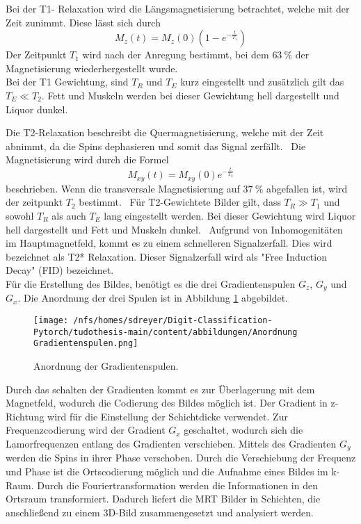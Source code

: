 Bei der T1- Relaxation wird die Längsmagnetisierung betrachtet, welche mit der Zeit zunimmt.
Diese lässt sich durch 
\begin{equation}
    M_z(t) = M_z(0) (1 - e^{-\frac{t}{T_1}})
\end{equation}
Der Zeitpunkt $T_1$ wird nach der Anregung bestimmt, bei dem $\qty{63}{\%}$ der Magnetisierung wiederhergestellt wurde.~\cite{Pollmann}\\
Bei der T1 Gewichtung, sind $T_R$ und $T_E$ kurz eingestellt und zusätzlich gilt das $T_E \ll T_2$.
Fett und Muskeln werden bei dieser Gewichtung hell dargestellt und Liquor dunkel.~\cite{Schlegel}

Die T2-Relaxation beschreibt die Quermagnetisierung, welche mit der Zeit abnimmt, da die Spins dephasieren und somit das Signal zerfällt.~\cite{Dössel}
Die Magnetisierung wird durch die Formel
\begin{equation}
    M_{xy}(t) = M_{xy}(0) e^{-\frac{t}{T_2}} 
\end{equation}
beschrieben.
Wenn die transversale Magnetisierung auf $\qty{37}{\%}$ abgefallen ist, wird der zeitpunkt $T_2$ bestimmt.~\cite{Pollmann}
Für T2-Gewichtete Bilder gilt, dass $T_R \gg T_1$ und sowohl $T_R$ als auch $T_E$  lang eingestellt werden. 
Bei dieser Gewichtung wird Liquor hell dargestellt und Fett und Muskeln dunkel.~\cite{Schlegel} 
Aufgrund von Inhomogenitäten im Hauptmagnetfeld, kommt es zu einem schnelleren Signalzerfall. Dies wird bezeichnet als T2* Relaxation.
Dieser Signalzerfall wird als "Free Induction Decay" (FID) bezeichnet.~\cite{Dössel}\\


Für die Erstellung des Bildes, benötigt es die drei Gradientenspulen $G_z$, $G_y$ und $G_x$. Die Anordnung der drei Spulen 
ist in Abbildung \ref{fig:an Grad} abgebildet.
\begin{figure}[htbp]
  \centering
  \texttt{[image: /nfs/homes/sdreyer/Digit-Classification-Pytorch/tudothesis-main/content/abbildungen/Anordnung Gradientenspulen.png]}
  \caption{Anordnung der Gradientenspulen.\cite{Schlegel}}
  \label{fig:an Grad}
\end{figure}
Durch das schalten der Gradienten kommt es zur Überlagerung mit dem Magnetfeld, wodurch die Codierung des Bildes möglich ist.
Der Gradient in z-Richtung wird für die Einstellung der Schichtdicke verwendet. 
Zur Frequenzcodierung wird der Gradient $G_x$ geschaltet, wodurch sich die Lamorfrequenzen entlang des Gradienten verschieben.
Mittels des Gradienten $G_y$ werden die Spins in ihrer Phase verschoben.
Durch die Verschiebung der Frequenz und Phase ist die Ortscodierung möglich und die Aufnahme eines Bildes im k-Raum.
Durch die Fouriertransformation werden die Informationen in den Ortsraum transformiert.
Dadurch liefert die MRT Bilder in Schichten, die anschließend zu einem 3D-Bild zusammengesetzt und analysiert werden.~\cite{pabst2013}



